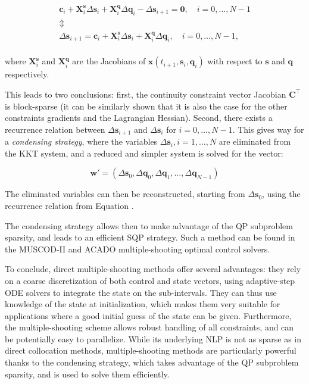 \begin{equation}
\label{eq:chap3-ms-recurrence}
\begin{array}{c}
\mathbf{c}_i +
\mathbf{X}_i^\mathbf{s}\Delta\mathbf{s}_i +
\mathbf{X}_i^\mathbf{q}\Delta\mathbf{q}_i - \Delta\mathbf{s}_{i+1}=\mathbf{0}, \quad i=0,\ldots,N-1\\
\Updownarrow\\
\Delta\mathbf{s}_{i+1}=\mathbf{c}_i + \mathbf{X}_i^\mathbf{s}\Delta\mathbf{s}_i +
\mathbf{X}_i^\mathbf{q}\Delta\mathbf{q}_i, \quad i=0,\ldots,N-1,\\
\end{array}
\end{equation}

where $\mathbf{X}_i^\mathbf{s}$ and $\mathbf{X}_i^\mathbf{q}$ are the
Jacobians of $\mathbf{x}(t_{i+1},\mathbf{s}_i,\mathbf{q}_i)$ with
respect to $\mathbf{s}$ and $\mathbf{q}$ respectively.

This leads to two conclusions: first, the continuity constraint vector
Jacobian $\mathbf{C}^\top$ is block-sparse (it can be similarly shown
that it is also the case for the other constraints gradients and the
Lagrangian Hessian). Second, there exists a recurrence relation
between $\Delta\mathbf{s}_{i+1}$ and $\Delta\mathbf{s}_i$ for
$i=0,\ldots,N-1$. This gives way for a \emph{condensing strategy},
where the variables $\Delta\mathbf{s}_i, i=1,\ldots,N$ are eliminated
from the KKT system, and a reduced and simpler system is solved for
the vector:

\begin{equation}
  \mathbf{w}' =
  (\Delta\mathbf{s}_0,\Delta\mathbf{q}_0,\Delta\mathbf{q}_1,
  \ldots,\Delta\mathbf{q}_{N-1})
\end{equation}

The eliminated variables can then be reconstructed, starting from
$\Delta\mathbf{s}_0$, using the recurrence relation from Equation
.

The condensing strategy allows then to make advantage of the QP
subproblem sparsity, and leads to an efficient SQP strategy. Such a
method can be found in the \textsc{MUSCOD-II}
\cite{leineweber2003efficient1,leineweber2003efficient2} and
\textsc{ACADO} \cite{houska2010acado} multiple-shooting optimal
control solvers.

To conclude, direct multiple-shooting methods offer several
advantages: they rely on a coarse discretization of both control and
state vectors, using adaptive-step ODE solvers to integrate the state
on the sub-intervals. They can thus use knowledge of the state at
initialization, which makes them very suitable for applications where
a good initial guess of the state can be given. Furthermore, the
multiple-shooting scheme allows robust handling of all constraints,
and can be potentially easy to parallelize. While its underlying NLP
is not as sparse as in direct collocation methods, multiple-shooting
methods are particularly powerful thanks to the condensing strategy,
which takes advantage of the QP subproblem sparsity, and is used to
solve them efficiently.

